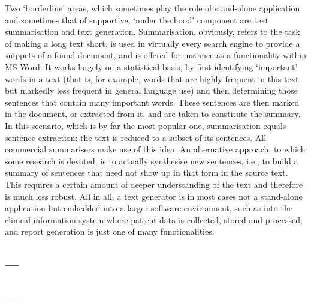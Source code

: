 \documentclass{scrartcl}
\begin{document}
\begin{Parallel}[c]{70mm}{70mm}
{    Two `borderline' areas, which sometimes play the role of stand-alone application and sometimes that of supportive, `under the hood' component are text summarisation and text generation. Summarisation, obviously, refers to the task of making a long text short, is used in virtually every search engine to provide a snippets of a found document, and is offered for instance as a functionality within MS Word. It works largely on a statistical basis, by first identifying `important' words in a text (that is, for example, words that are highly frequent in this text but markedly less frequent in general language use) and then determining those sentences that contain many important words. These sentences are then marked in the document, or extracted from it, and are taken to constitute the summary. In this scenario, which is by far the most popular one, summarisation equals sentence extraction: the text is reduced to a subset of its sentences. All commercial summarisers make use of this idea. An alternative approach, to which some research is devoted, is to actually synthesise new sentences, i.e., to build a summary of sentences that need not show up in that form in the source text. This requires a certain amount of deeper understanding of the text and therefore is much less robust. All in all, a text generator is in most cases not a stand-alone application but embedded into a larger software environment, such as into the clinical information system where patient data is collected, stored and processed, and report generation is just one of many functionalities.

    

      }

  \ParallelPar


  \subsection{  ---  }

  \MyParallelLText{

}

  \MyParallelRText{


  }

  \ParallelPar




  \MyParallelLText{
   
}

  \MyParallelRText{
   
}

  \ParallelPar


 \subsection{ --- }


\end{Parallel}
\end{document}
